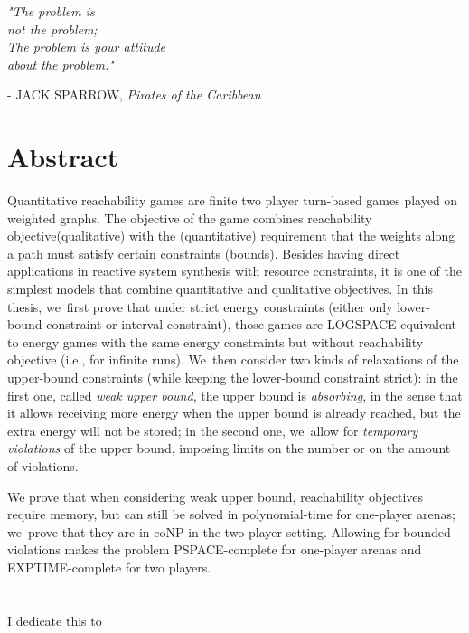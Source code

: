 \documentclass[a4paper,12pt, twoside]{book}
\newlength\longest
\theoremstyle{definition}
\begin{document}
\settowidth{}
\begin{center}
\parbox{\longest}{%
  \raggedright{\huge\itshape%
   "The problem is \\ 
  not the problem; \\
  The problem is your attitude \\ 
  about the problem."\par\bigskip
  }   
  \raggedleft\Large\MakeUppercase{- Jack Sparrow}, \textit{Pirates of the Caribbean}\par%
}
\end{center}

\vfill\vfill

\chapter*{Abstract}
Quantitative reachability games are finite two player turn-based games played on weighted graphs. The objective of the game combines reachability objective(qualitative) with the (quantitative) requirement that the weights along a path must satisfy certain constraints (bounds). Besides having direct applications in reactive system synthesis with resource constraints, it is one of the simplest models that combine quantitative and qualitative objectives.
\vskip 0.5cm
In this thesis, we~first prove that under strict energy constraints (either only
lower-bound constraint or interval constraint), those games are
LOGSPACE-equivalent to energy games with the same energy constraints but without reachability objective (i.e., for infinite
runs). We~then consider two kinds of
relaxations of the upper-bound constraints (while keeping the
lower-bound constraint strict): in the first one, called \emph{weak
upper bound}, the upper bound is \emph{absorbing}, in the sense that
it allows receiving more energy when the upper bound is already
reached, but the extra energy will not be stored; in the second one,
we~allow for \emph{temporary violations} of the upper bound, imposing
limits on the number or on the amount of violations.

%
We prove that when considering weak upper bound, reachability
objectives require memory, but can still be solved in polynomial-time
for one-player arenas; we~prove that they are in coNP in the two-player
setting. Allowing for bounded violations makes the
problem PSPACE-complete for one-player arenas and EXPTIME-complete
for two players.

\chapter*{%
}
I dedicate this to 
 
\end{document}
